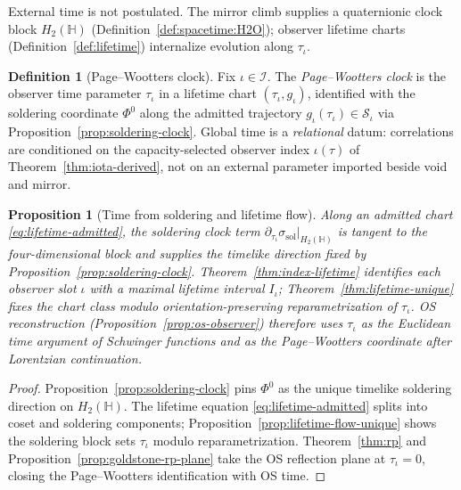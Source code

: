 \documentclass[aps,prd,onecolumn,amsmath,amssymb,nofootinbib,11pt]{revtex4-2}
\numberwithin{equation}{section}
\theoremstyle{plain}
\newtheorem{proposition}[theorem]{Proposition}
\theoremstyle{definition}
\newtheorem{definition}[theorem]{Definition}
\theoremstyle{remark}
\newcommand{\Quat}{\mathbb{H}}
\newcommand{\orderparam}{\Phi}
\begin{document}
External time is not postulated. The mirror climb supplies a quaternionic clock
block $H_2(\Quat)$ (Definition~\ref{def:spacetime:H2O}); observer lifetime
charts (Definition~\ref{def:lifetime}) internalize evolution along
$\tau_\iota$.

\begin{definition}[Page--Wootters clock]\label{def:page-wootters}
Fix $\iota\in\mathcal{I}$. The \emph{Page--Wootters clock} is the observer
time parameter $\tau_\iota$ in a lifetime chart $(\tau_\iota,g_\iota)$,
identified with the soldering coordinate $\orderparam^0$ along the admitted
trajectory $g_\iota(\tau_\iota)\in\mathcal{S}_\iota$ via
Proposition~\ref{prop:soldering-clock}. Global time is a \emph{relational}
datum: correlations are conditioned on the capacity-selected observer index
$\iota(\tau)$ of Theorem~\ref{thm:iota-derived}, not on an external
parameter imported beside void and mirror.
\end{definition}

\begin{proposition}[Time from soldering and lifetime flow]
\label{prop:page-wootters-derived}
Along an admitted chart \eqref{eq:lifetime-admitted}, the soldering clock term
$\partial_{\tau_\iota}\sigma_{\mathrm{sol}}|_{H_2(\Quat)}$ is tangent to the
four-dimensional block and supplies the timelike direction fixed by
Proposition~\ref{prop:soldering-clock}. Theorem~\ref{thm:index-lifetime}
identifies each observer slot $\iota$ with a maximal lifetime interval
$I_\iota$; Theorem~\ref{thm:lifetime-unique} fixes the chart class modulo
orientation-preserving reparametrization of $\tau_\iota$. OS reconstruction
(Proposition~\ref{prop:os-observer}) therefore uses $\tau_\iota$ as the
Euclidean time argument of Schwinger functions and as the Page--Wootters
coordinate after Lorentzian continuation.
\end{proposition}

\begin{proof}
Proposition~\ref{prop:soldering-clock} pins $\orderparam^0$ as the unique
timelike soldering direction on $H_2(\Quat)$. The lifetime equation
\eqref{eq:lifetime-admitted} splits into coset and soldering components;
Proposition~\ref{prop:lifetime-flow-unique} shows the soldering block sets
$\tau_\iota$ modulo reparametrization. Theorem~\ref{thm:rp} and
Proposition~\ref{prop:goldstone-rp-plane} take the OS reflection plane at
$\tau_\iota=0$, closing the Page--Wootters identification with OS time.
\end{proof}
\end{document}
